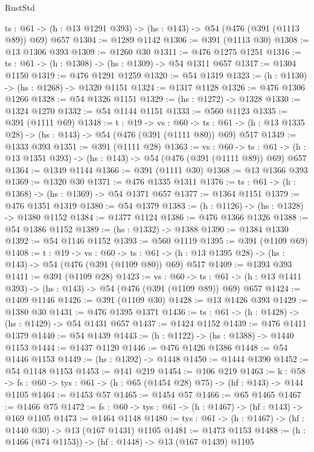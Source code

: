 \begin{lexlean}{RustStd}
\begin{coremodule}
  {ts : @61} -> (h : @13 @1291 @393) -> (hs : @143) -> @54 (@476 (@391 (@1113 @89)) @69) @657
@1304 := @1289 @1142
@1306 := @391 (@1113 @30)
@1308 := @13 @1306 @393
@1309 := @1260 @30
@1311 := @476 @1275 @1251
@1316 := {ts : @61} -> (h : @1308) -> (hs : @1309) -> @54 @1311 @657
@1317 := @1304 @1150
@1319 := @476 @1291 @1259
@1320 := @54 @1319
@1323 := (h : @1130) -> (hs : @1268) -> @1320 @1151
@1324 := @1317 @1128
@1326 := @476 @1306 @1266
@1328 := @54 @1326 @1151
@1329 := (hs : @1272) -> @1328
@1330 := @1324 @1270
@1332 := @54 @1144 @1151
@1333 := @560 @1123
@1335 := @391 (@1111 @69)
@1348 := {t : @19} ->
  {vs : @60} ->
  {ts : @61} -> (h : @13 @1335 @28) -> (hs : @143) -> @54 (@476 (@391 (@1111 @80)) @69) @517
@1349 := @1333 @393
@1351 := @391 (@1111 @28)
@1363 := {vs : @60} ->
  {ts : @61} -> (h : @13 @1351 @393) -> (hs : @143) -> @54 (@476 (@391 (@1111 @89)) @69) @657
@1364 := @1349 @1144
@1366 := @391 (@1111 @30)
@1368 := @13 @1366 @393
@1369 := @1320 @30
@1371 := @476 @1335 @1311
@1376 := {ts : @61} -> (h : @1368) -> (hs : @1369) -> @54 @1371 @657
@1377 := @1364 @1151
@1379 := @476 @1351 @1319
@1380 := @54 @1379
@1383 := (h : @1126) -> (hs : @1328) -> @1380 @1152
@1384 := @1377 @1124
@1386 := @476 @1366 @1326
@1388 := @54 @1386 @1152
@1389 := (hs : @1332) -> @1388
@1390 := @1384 @1330
@1392 := @54 @1146 @1152
@1393 := @560 @1119
@1395 := @391 (@1109 @69)
@1408 := {t : @19} ->
  {vs : @60} ->
  {ts : @61} -> (h : @13 @1395 @28) -> (hs : @143) -> @54 (@476 (@391 (@1109 @80)) @69) @517
@1409 := @1393 @393
@1411 := @391 (@1109 @28)
@1423 := {vs : @60} ->
  {ts : @61} -> (h : @13 @1411 @393) -> (hs : @143) -> @54 (@476 (@391 (@1109 @89)) @69) @657
@1424 := @1409 @1146
@1426 := @391 (@1109 @30)
@1428 := @13 @1426 @393
@1429 := @1380 @30
@1431 := @476 @1395 @1371
@1436 := {ts : @61} -> (h : @1428) -> (hs : @1429) -> @54 @1431 @657
@1437 := @1424 @1152
@1439 := @476 @1411 @1379
@1440 := @54 @1439
@1443 := (h : @1122) -> (hs : @1388) -> @1440 @1153
@1444 := @1437 @1120
@1446 := @476 @1426 @1386
@1448 := @54 @1446 @1153
@1449 := (hs : @1392) -> @1448
@1450 := @1444 @1390
@1452 := @54 @1148 @1153
@1453 := @141 @219
@1454 := @106 @219
@1463 := {k : @58} ->
  {fs : @60} -> {tys : @61} -> (h : @65 (@1454 @28) @75) -> (hf : @143) -> @144 @1105
@1464 := @1453 @57
@1465 := @1454 @57
@1466 := @65 @1465
@1467 := @1466 @75
@1472 := {fs : @60} -> {tys : @61} -> (h : @1467) -> (hf : @143) -> @169 @1105
@1473 := @1464 @1148
@1480 := {tys : @61} -> (h : @1467) -> (hf : @1440 @30) -> @13 (@167 @1431) @1105
@1481 := @1473 @1153
@1488 := (h : @1466 (@74 @1153)) -> (hf : @1448) -> @13 (@167 @1439) @1105

\end{coremodule}
\end{lexlean}

